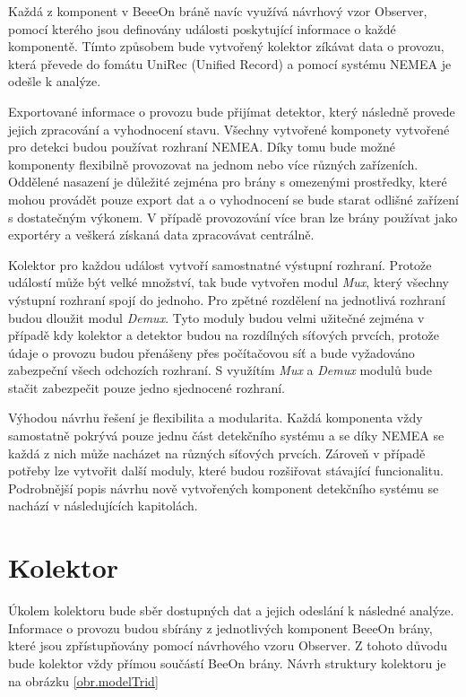  Každá z komponent v BeeeOn bráně navíc využívá návrhový vzor Observer, pomocí kterého jsou
 definovány události poskytující informace o každé komponentě. 
 Tímto způsobem bude vytvořený kolektor zíkávat data o provozu, která
 převede do fomátu UniRec (Unified Record) a pomocí systému NEMEA je odešle k analýze.
 
 Exportované informace o provozu bude přijímat detektor, který následně provede jejich zpracování a 
 vyhodnocení stavu. Všechny vytvořené komponety vytvořené pro detekci budou používat rozhraní 
 NEMEA. Díky tomu bude možné komponenty flexibilně provozovat na jednom nebo více různých zařízeních.
 Oddělené nasazení je důležité zejména pro brány s omezenými prostředky, které mohou provádět 
 pouze export dat a o vyhodnocení se bude starat odlišné zařízení s dostatečným výkonem. V případě 
 provozování více bran lze brány používat jako exportéry a veškerá získaná data zpracovávat 
 centrálně. 
 
 Kolektor pro každou událost vytvoří samostnatné výstupní rozhraní. Protože událostí může být 
 velké množství, tak bude vytvořen modul \textit{Mux}, který všechny výstupní rozhraní spojí do jednoho. 
 Pro zpětné rozdělení na jednotlivá rozhraní budou dloužit modul \textit{Demux}. Tyto moduly budou velmi užitečné
 zejména v případě kdy kolektor a detektor budou na rozdílných síťových prvcích, protože údaje 
 o provozu budou přenášeny přes počítačovou síť a bude vyžadováno zabezpeční všech odchozích
 rozhraní. S využítím \textit{Mux} a \textit{Demux} modulů bude stačit zabezpečit pouze jedno sjednocené rozhraní. 
 
 Výhodou návrhu řešení je flexibilita a modularita. Každá komponenta vždy samostatně pokrývá pouze jednu
 část detekčního systému a se díky NEMEA se každá z nich může nacházet na různých síťových prvcích. Zároveň
 v případě potřeby lze vytvořit další moduly, které budou rozšiřovat stávající funcionalitu.
 Podrobnější popis návrhu nově vytvořených komponent detekčního systému se nachází v následujících kapitolách.
 
 \section{Kolektor}
 Úkolem kolektoru bude sběr dostupných dat a jejich odeslání k následné analýze. Informace o 
 provozu budou sbírány z jednotlivých komponent BeeeOn brány, které jsou zpřístupňovány pomocí 
 návrhového vzoru Observer. Z tohoto důvodu bude kolektor vždy přímou součástí BeeOn brány. 
 Návrh struktury kolektoru je na obrázku \ref{obr.modelTrid}
 
